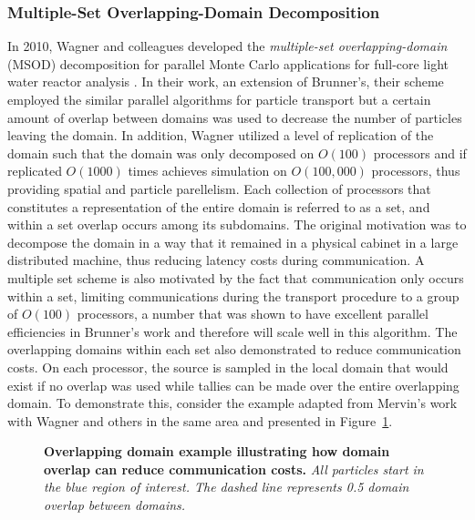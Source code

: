 \subsubsection{Multiple-Set Overlapping-Domain Decomposition}
\label{subsubsec:msod}
In 2010, Wagner and colleagues developed the \textit{multiple-set
  overlapping-domain} (MSOD) decomposition for parallel Monte Carlo
applications for full-core light water reactor analysis
\citep{wagner_hybrid_2010}. In their work, an extension of Brunner's,
their scheme employed the similar parallel algorithms for particle
transport but a certain amount of overlap between domains was used to
decrease the number of particles leaving the domain. In addition,
Wagner utilized a level of replication of the domain such that the
domain was only decomposed on $O(100)$ processors and if replicated
$O(1000)$ times achieves simulation on $O(100,000)$ processors, thus
providing spatial and particle parellelism. Each collection of
processors that constitutes a representation of the entire domain is
referred to as a set, and within a set overlap occurs among its
subdomains. The original motivation was to decompose the domain in a
way that it remained in a physical cabinet in a large distributed
machine, thus reducing latency costs during communication. A multiple
set scheme is also motivated by the fact that communication only
occurs within a set, limiting communications during the transport
procedure to a group of $O(100)$ processors, a number that was shown
to have excellent parallel efficiencies in Brunner's work and
therefore will scale well in this algorithm. The overlapping domains
within each set also demonstrated to reduce communication costs. On
each processor, the source is sampled in the local domain that would
exist if no overlap was used while tallies can be made over the entire
overlapping domain. To demonstrate this, consider the example adapted
from Mervin's work with Wagner and others in the same area
\citep{mervin_variance_2012} and presented in
Figure~\ref{fig:msod_example}.
\begin{figure}[htpb!]
  \begin{center}
    \scalebox{1.5}{
       }
  \end{center}
  \caption{\textbf{Overlapping domain example illustrating how domain
      overlap can reduce communication costs.}
    \textit{All particles start in the blue region of interest. The
      dashed line represents 0.5 domain overlap between domains.}}
  \label{fig:msod_example}
\end{figure}
